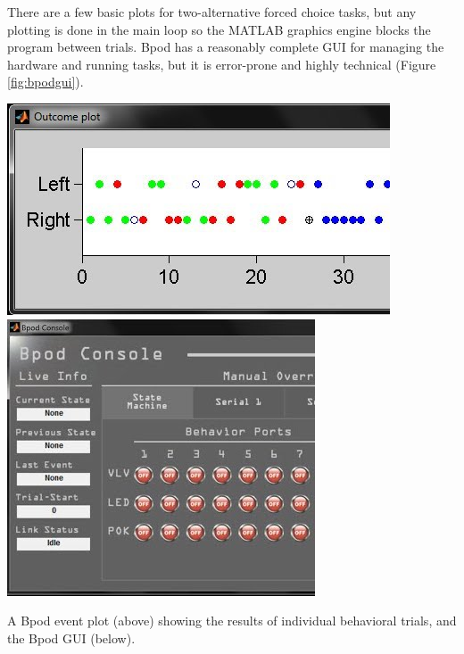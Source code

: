 \documentclass[nohyper, justified, notitlepage, marginals=raggedright,twoside=false,debug]{tufte-autopilot}
\begin{document}
There are a few basic plots for two-alternative forced choice tasks, but any plotting is done in the main loop so the MATLAB graphics engine blocks the program between trials. Bpod has a reasonably complete GUI for managing the hardware and running tasks, but it is error-prone and highly technical (Figure \ref{fig:bpodgui}).

\begin{marginfigure}
\noindent\includegraphics[]{figures/side_11_bplot.jpg}
\includegraphics[]{figures/Bconsole.jpg}
\caption{A Bpod event plot (above) showing the results of individual behavioral trials, and the Bpod GUI (below).} 
\label{fig:bpodgui}
\end{marginfigure}


\vspace{16pt}
\end{document}
